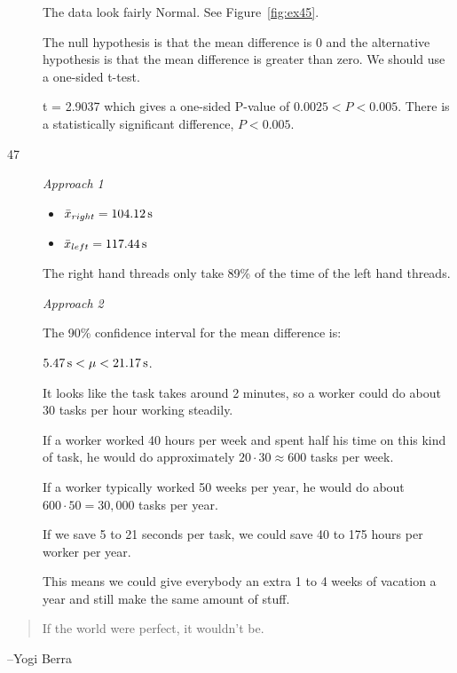 \documentclass[letterpaper, landscape]{exam}
\begin{document}
\begin{description}
        The data look fairly Normal. See Figure~\ref{fig:ex45}.

        The null hypothesis is that the mean difference is 0 and the alternative
        hypothesis is that the mean difference is greater than zero. We should
        use a one-sided t-test.

        t = 2.9037 which gives a one-sided P-value of $0.0025 < P < 0.005$. There is
        a statistically significant difference, $P < 0.005$.
        
      \item[47]

        {\em Approach 1\/}

        \begin{itemize}[parsep=0pt, label={}]
          \item $\bar{x}_{right} = \unit[104.12]{s}$
          \item $\bar{x}_{left} = \unit[117.44]{s}$
        \end{itemize}

        The right hand threads only take 89\% of the time of the left hand
        threads.

        {\em Approach 2\/}

        The 90\% confidence interval for the mean difference is:

        $\unit[5.47]{s} < \mu < \unit[21.17]{s}$.

        It looks like the task takes around 2 minutes, so a worker could do
        about 30 tasks per hour working steadily. 

        If a worker worked 40 hours per week and spent half his time on this
        kind of task, he would do approximately $20 \cdot 30 \approx 600$ tasks
        per week. 
        
        If a worker typically worked 50 weeks per year, he would do about $600
        \cdot 50 = 30,000$ tasks per year.

        If we save 5 to 21 seconds per task, we could save 40 to 175 hours per
        worker per year. 

        This means we could give everybody an extra 1 to 4 weeks of vacation a
        year and still make the same amount of stuff.

  \end{description}

  \else
    \vspace{12 cm}
    \begin{quote}
      \begin{em}
        If the world were perfect, it wouldn't be.
      \end{em}
    \end{quote}
    \hspace{1 cm}--Yogi Berra
  \fi
\end{document}
